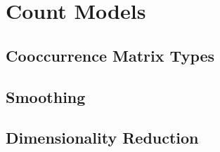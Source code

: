 \chapter{Count Models}\label{chap:count-models}
\section{Cooccurrence Matrix Types}
\section{Smoothing}
\section{Dimensionality Reduction}
